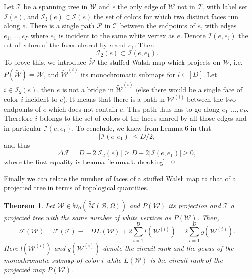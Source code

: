 \documentclass[aps,prd,10pt,notitlepage,nofootinbib,superscriptaddress,showkeys,showpacs]{revtex4-1}
\newtheorem{theorem}{Theorem}
\begin{document}
Let ${\mathcal{T}}$ be a spanning tree in ${\mathcal{W}}$ and $e$ the only edge of ${\mathcal{W}}$ not in ${\mathcal{T}}$, with label set ${\mathcal{I}}(e)$, and ${\mathcal{I}}_2(e)\subset {\mathcal{I}}(e)$ the set of colors for which two distinct faces run along $e$. There is a single path ${\mathcal{P}}$ in ${\mathcal{T}}$ between the endpoints of $e$, with edges $e_1, \dotsc, e_P$ where $e_1$ is incident to the same white vertex as $e$. Denote ${\mathcal{I}}(e, e_1)$ the set of colors of the faces shared by $e$ and $e_1$. Then 
\begin{equation}
{\mathcal{I}}_2(e) \subset {\mathcal{I}}(e, e_1).
\end{equation}
To prove this, we introduce $\tilde{\mathcal{W}}$ the stuffed Walsh map which projects on ${\mathcal{W}}$, i.e. $P(\tilde{\mathcal{W}}) = {\mathcal{W}}$, and $\tilde{\mathcal{W}}^{(i)}$ its monochromatic submaps for $i\in[D]$. Let $i\in{\mathcal{I}}_2(e)$, then $e$ is not a bridge in $\tilde{\mathcal{W}}^{(i)}$ (else there would be a single face of color $i$ incident to $e$). It means that there is a path in ${\mathcal{W}}^{(i)}$ between the two endpoints of $e$ which does not contain $e$. This path thus has to go along $e_1, \dotsc, e_P$. Therefore $i$ belongs to the set of colors of the faces shared by all those edges and in particular ${\mathcal{I}}(e, e_1)$. To conclude, we know from Lemma 6 in \cite{Universality} that
\begin{equation}
|{\mathcal{I}}(e, e_1)| \leq D/2,
\end{equation}
and thus 
\begin{equation}
\Delta {\mathcal{F}} = D - 2|{\mathcal{I}}_2(e)| \geq D - 2|{\mathcal{I}}(e, e_1)| \geq 0,
\end{equation}
where the first equality is Lemma \ref{lemma:Unhooking}.
\qed

Finally we can relate the number of faces of a stuffed Walsh map to that of a projected tree in terms of topological quantities.

\begin{theorem} \label{prop:CharDomOrder}
Let ${\mathcal{W}}\in{\mathbb{W}}_0(\tilde{\mathcal{M}}({\mathcal{B}}, \Omega))$ and $P({\mathcal{W}})$ its projection and ${\mathcal{T}}$ a projected tree with the same number of white vertices as $P({\mathcal{W}})$. Then,
\begin{equation}
{\mathcal{F}}({\mathcal{W}}) - {\mathcal{F}}({\mathcal{T}}) = - D L({\mathcal{W}}) + 2 \sum_{i=1}^D l({\mathcal{W}}^{(i)}) - 2 \sum_{i=1}^D g({\mathcal{W}}^{(i)}).
\end{equation}
Here $l({\mathcal{W}}^{(i)})$ and $g({\mathcal{W}}^{(i)})$ denote the circuit rank and the genus of the monochromatic submap of color $i$ while $L({\mathcal{W}})$ is the circuit rank of the \emph{projected} map $P({\mathcal{W}})$.
\end{theorem}
\end{document}
